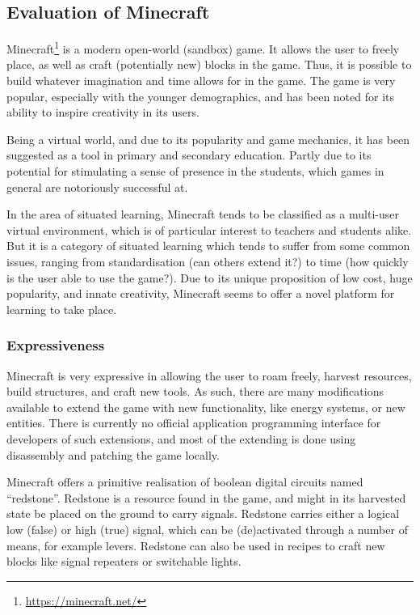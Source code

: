 \subsection{Evaluation of Minecraft}

Minecraft\footnote{\url{https://minecraft.net/}} is a modern open-world 
(sandbox) game. It allows the user to freely place, as well as craft 
(potentially new) blocks in the game. Thus, it is possible to build whatever 
imagination and time allows for in the game. The game is very popular, 
especially with the younger demographics, and has been noted for its ability 
to inspire creativity in its users\cite{minecraftign}.

Being a virtual world, and due to its popularity and game mechanics, it has been
suggested as a tool in primary and secondary education. Partly due to its 
potential for stimulating a sense of presence in the 
students\cite{coudrayminecraft}, which games in general are notoriously 
successful at.

In the area of situated learning, Minecraft tends to be classified as a
multi-user virtual environment, which is of particular interest to teachers
and students alike. But it is a category of situated learning which tends to 
suffer from some common issues, ranging from standardisation (can others 
extend it?) to time (how quickly is the user able to use the 
game?)\cite{dawley2014situated}. Due to its unique proposition of low cost, 
huge popularity, and innate creativity, Minecraft seems to offer a novel 
platform for learning to take place\cite{coudrayminecraft}.

\subsubsection{Expressiveness}

Minecraft is very expressive in allowing the user to roam freely, harvest 
resources, build structures, and craft new tools. As such, there are many 
modifications available to extend the game with new functionality, like energy 
systems, or new entities. There is currently no official application 
programming interface for developers of such extensions, and most of the 
extending is done using disassembly and patching the game locally.

Minecraft offers a primitive realisation of boolean digital circuits named
``redstone''. Redstone is a resource found in the game, and might in its 
harvested
state be placed on the ground to carry signals. Redstone carries either a
logical low (false) or high (true) signal, which can be (de)activated through 
a number of means, for example levers. Redstone can also be used in recipes to
craft new blocks like signal repeaters or switchable lights.

